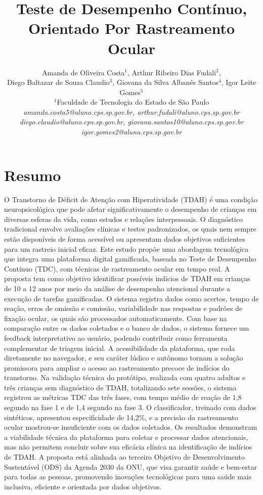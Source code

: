 \documentclass[11pt,a4paper]{article}
\title{\vspace{0.6cm}\textbf{\Large Teste de Desempenho Contínuo, Orientado Por Rastreamento Ocular}}
\author{
    Amanda de Oliveira Costa$^{1}$, Arthur Ribeiro Dias Fudali$^{2}$, \\ Diego Baltazar de Souza Claudio$^{3}$, Giovana da Silva Albanês Santos$^{4}$, Igor Leite Gomes$^{5}$ \\[0.3cm]
    \small
    $^{1}$Faculdade de Tecnologia do Estado de São Paulo \\
    \textit{amanda.costa5@aluno.cps.sp.gov.br, arthur.fudali@aluno.cps.sp.gov.br} \\
    \textit{ diego.claudio@aluno.cps.sp.gov.br, giovana.santos10@aluno.cps.sp.gov.br} \\
    \textit{igor.gomes2@aluno.cps.sp.gov.br}
}
\date{}
\begin{document}
\pagestyle{fancy}

\maketitle
\thispagestyle{fancy}

\section*{Resumo}

O Transtorno de Déficit de Atenção com Hiperatividade (TDAH) é uma condição neuropsicológica que pode afetar significativamente o
desempenho de crianças em diversas esferas da vida, como estudos e relações interpessoais. O diagnóstico tradicional
envolve avaliações clínicas e testes padronizados, os quais nem sempre estão disponíveis de forma acessível ou
apresentam dados objetivos suficientes para um rastreio inicial eficaz. Este estudo propõe uma abordagem tecnológica
que integra uma plataforma digital gamificada, baseada no Teste de Desempenho Contínuo (TDC), com técnicas de
rastreamento ocular em tempo real. A proposta tem como objetivo identificar possíveis indícios de TDAH em crianças
de 10 a 12 anos por meio da análise de desempenho atencional durante a execução de tarefas gamificadas. O sistema
registra dados como acertos, tempo de reação, erros de omissão e comissão, variabilidade nas respostas e padrões de
fixação ocular, os quais são processados automaticamente. Com base na comparação entre os dados coletados e o banco de dados,
o sistema fornece um feedback interpretativo ao usuário, podendo contribuir como ferramenta complementar de
triagem inicial. A acessibilidade da plataforma, que roda diretamente no navegador, e seu caráter lúdico e autônomo
tornam a solução promissora para ampliar o acesso ao rastreamento precoce de indícios do transtorno. Na validação técnica do protótipo, realizada com quatro adultos e três crianças sem diagnóstico de TDAH, totalizando sete sessões, o sistema registrou as métricas TDC das três fases, com tempo médio de reação de 1,8 segundo na fase 1 e de 1,4 segundo na fase 3. O classificador, treinado com dados sintéticos, apresentou especificidade de 14,2\%, e a precisão do rastreamento ocular mostrou-se insuficiente com os dados coletados. Os resultados demonstram a viabilidade técnica da plataforma para coletar e processar dados atencionais, mas não permitem concluir sobre sua eficácia clínica na identificação de indícios de TDAH. A proposta
está alinhada ao terceiro Objetivo de Desenvolvimento Sustentável (ODS) da Agenda 2030 da ONU, que visa garantir
saúde e bem-estar para todas as pessoas, promovendo inovações tecnológicas para uma saúde mais inclusiva, eficiente
e orientada por dados objetivos.
\end{document}
